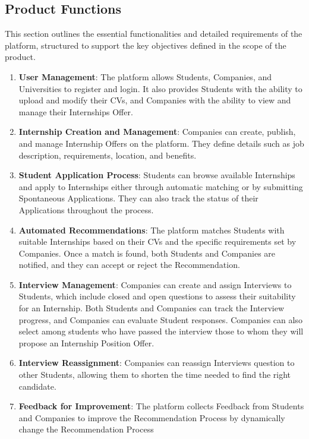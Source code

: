 \subsection{Product Functions}
This section outlines the essential functionalities and detailed requirements of the platform, structured to support the key objectives defined in the scope of the product.
\begin{enumerate}
    \item \textbf{\color{titleColor}User Management}: The platform allows Students, Companies, and Universities to register and login. It also provides Students with the ability to upload and modify their CVs, and Companies with the ability to view and manage their Internships Offer.
    \item \textbf{\color{titleColor}Internship Creation and Management}: Companies can create, publish, and manage Internship Offers on the platform. They define details such as job description, requirements, location, and benefits. %
    \item \textbf{\color{titleColor}Student Application Process}: Students can browse available Internships and apply to Internships either through automatic matching or by submitting Spontaneous Applications. They can also track the status of their Applications throughout the process.
    \item \textbf{\color{titleColor}Automated Recommendations}: The platform matches Students with suitable Internships based on their CVs and the specific requirements set by Companies. Once a match is found, both Students and Companies are notified, and they can accept or reject the Recommendation.
    \item \textbf{\color{titleColor}Interview Management}: Companies can create and assign Interviews to Students, which include closed and open questions to assess their suitability for an Internship. Both Students and Companies can track the Interview progress, and Companies can evaluate Student responses. Companies can also select among students who have passed the interview those to whom they will propose an Internship Position Offer.
    \item \textbf{\color{titleColor}Interview Reassignment}:
    Companies can reassign Interviews question to other Students, allowing them to shorten the time needed to find the right candidate.
    \item \textbf{\color{titleColor}Feedback for Improvement}: The platform collects Feedback from Students and Companies to improve the Recommendation Process by dynamically change the Recommendation Process

\end{enumerate}
